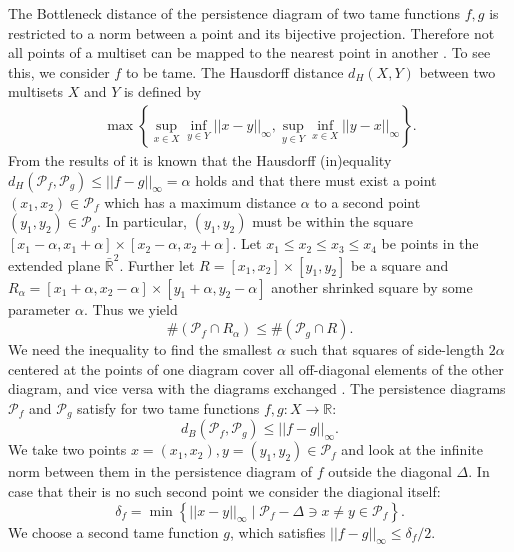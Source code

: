 \documentclass[runningheads]{llncs}
\begin{document}
The Bottleneck distance of the persistence diagram of two tame functions $f,g$ is restricted to a norm between a point and its bijective projection. Therefore not all points of a multiset can be mapped to the nearest point in another \cite{Cohen-SteinerEH07}. To see this, we consider $f$ to be tame. The Hausdorff distance $d_H(X,Y)$ between two multisets $X$ and $Y$ is defined by
\begin{align}
\max \left\{\sup_{x \in X} \inf_{y \in Y} ||x-y||_\infty, \sup_{y \in Y} \inf_{x \in X} ||y-x||_\infty \right\}.
\end{align}
From the results of \cite{CerriL16} it is known that the Hausdorff (in)equality $d_H(\mathcal{P}_f,\mathcal{P}_g) \leq ||f-g||_\infty = \alpha$ holds and that there must exist a point $(x_1,x_2) \in \mathcal{P}_f$ which has a maximum distance $\alpha$ to a second point $(y_1,y_2) \in \mathcal{P}_g$. In particular, $(y_1,y_2)$ must be within the square $[x_1 -\alpha, x_1 + \alpha] \times [x_2-\alpha, x_2+\alpha]$. Let $x_1 \leq x_2 \leq x_3 \leq x_4$ be points in the extended plane $\bar{\mathbb{R}}^2$. Further let $R = [x_1,x_2] \times [y_1,y_2]$ be a square and $R_\alpha = [x_1+\alpha,x_2-\alpha] \times [y_1+\alpha,y_2-\alpha]$ another shrinked square by some parameter $\alpha$. Thus we yield
\begin{equation}
\label{boxlemma}
\#\left( \mathcal{P}_f \cap R_\alpha \right) \leq \#\left(\mathcal{P}_g \cap R \right).
\end{equation}
We need the inequality to find the smallest $\alpha$ such that squares of side-length $2 \alpha$ centered at the points of one diagram cover all off-diagonal elements of the other diagram, and vice versa with the diagrams exchanged \cite{Cohen-SteinerEH07}. The persistence diagrams $\mathcal{P}_f$ and $\mathcal{P}_g$ satisfy for two tame functions $f,g: X \rightarrow \mathbb{R}$:
\begin{equation}
d_B\left(\mathcal{P}_f,\mathcal{P}_g\right) \leq ||f-g||_\infty.
\end{equation}
We take two points $x = (x_1,x_2), y=(y_1,y_2) \in \mathcal{P}_f$ and look at the infinite norm between them in the persistence diagram of $f$ outside the diagonal $\Delta$. In case that their is no such second point we consider the diagional itself:
\begin{equation}
\delta_f = \min\left\{ ||x-y||_\infty \; \vert \; \mathcal{P}_f-\Delta \ni x \neq y \in \mathcal{P}_f \right\}.
\end{equation}
We choose a second tame function $g$, which satisfies $||f-g||_\infty \leq \delta_f/2$.
\end{document}
